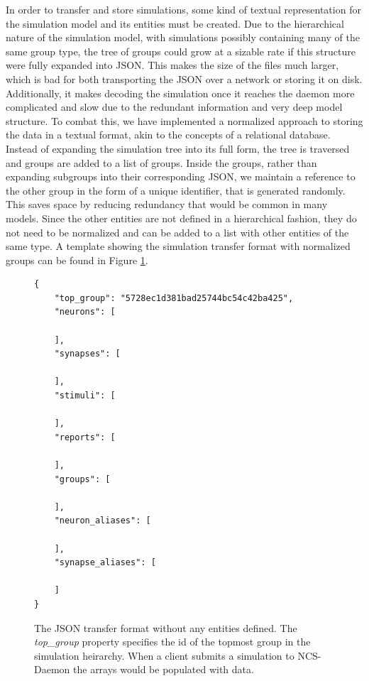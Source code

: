 In order to transfer and store simulations, some kind of textual representation for the simulation model and its entities must be created. Due to the hierarchical nature of the simulation model, with simulations possibly containing many of the same group type, the tree of groups could grow at a sizable rate if this structure were fully expanded into JSON. This makes the size of the files much larger, which is bad for both transporting the JSON over a network or storing it on disk. Additionally, it makes decoding the simulation once it reaches the daemon more complicated and slow due to the redundant information and very deep model structure. To combat this, we have implemented a normalized approach to storing the data in a textual format, akin to the concepts of a relational database. Instead of expanding the simulation tree into its full form, the tree is traversed and groups are added to a list of groups. Inside the groups, rather than expanding subgroups into their corresponding JSON, we maintain a reference to the other group in the form of a unique identifier, that is generated randomly. This saves space by reducing redundancy that would be common in many models. Since the other entities are not defined in a hierarchical fashion, they do not need to be normalized and can be added to a list with other entities of the same type. A template showing the simulation transfer format with normalized groups can be found in Figure \ref{fig:empty_transfer_format}.

\begin{figure}
\begin{center}
\begin{lstlisting}
{
    "top_group": "5728ec1d381bad25744bc54c42ba425",
    "neurons": [
    
    ],
    "synapses": [
    
    ],
    "stimuli": [
    
    ],
    "reports": [
    
    ],
    "groups": [
    
    ],
    "neuron_aliases": [
    
    ],
    "synapse_aliases": [
    
    ]
}
\end{lstlisting}
\caption[JSON Transfer Format]{The JSON transfer format without any entities defined. The \emph{top\_group} property specifies the id of the topmost group in the simulation heirarchy. When a client submits a simulation to NCS-Daemon the arrays would be populated with data.\label{fig:empty_transfer_format}}
\end{center}
\end{figure}


